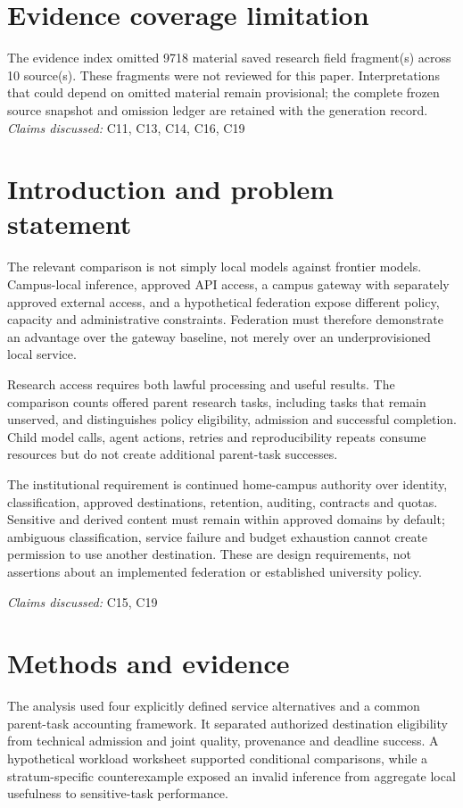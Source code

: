 \documentclass[11pt]{article}
\begin{document}
\section*{Evidence coverage limitation}
The evidence index omitted 9718 material saved research field fragment(s) across 10 source(s). These fragments were not reviewed for this paper. Interpretations that could depend on omitted material remain provisional; the complete frozen source snapshot and omission ledger are retained with the generation record.
\textit{Claims discussed: }C11, C13, C14, C16, C19
\section{Introduction and problem statement}
The relevant comparison is not simply local models against frontier models. Campus-local inference, approved API access, a campus gateway with separately approved external access, and a hypothetical federation expose different policy, capacity and administrative constraints. Federation must therefore demonstrate an advantage over the gateway baseline, not merely over an underprovisioned local service.

Research access requires both lawful processing and useful results. The comparison counts offered parent research tasks, including tasks that remain unserved, and distinguishes policy eligibility, admission and successful completion. Child model calls, agent actions, retries and reproducibility repeats consume resources but do not create additional parent-task successes.

The institutional requirement is continued home-campus authority over identity, classification, approved destinations, retention, auditing, contracts and quotas. Sensitive and derived content must remain within approved domains by default; ambiguous classification, service failure and budget exhaustion cannot create permission to use another destination. These are design requirements, not assertions about an implemented federation or established university policy.

\textit{Claims discussed: }C15, C19
\section{Methods and evidence}
The analysis used four explicitly defined service alternatives and a common parent-task accounting framework. It separated authorized destination eligibility from technical admission and joint quality, provenance and deadline success. A hypothetical workload worksheet supported conditional comparisons, while a stratum-specific counterexample exposed an invalid inference from aggregate local usefulness to sensitive-task performance.
\end{document}
